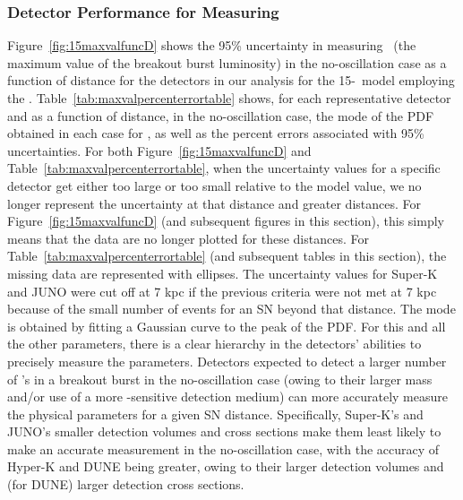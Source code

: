 \subsubsection{Detector Performance for Measuring \lmax}
Figure~\ref{fig:15maxvalfuncD} shows the 95\% uncertainty in
measuring \lmax\ (the maximum value of the breakout burst luminosity)
in the no-oscillation case as a function of distance for the detectors in our
analysis for the 15-\Msol\ model employing the \ls. 
Table~\ref{tab:maxvalpercenterrortable} shows, for each representative
detector and as a function of distance, in the no-oscillation case, 
the mode of the PDF obtained
in each case for \lmax, as well as the percent
errors associated with 95\% uncertainties.  For both
Figure~\ref{fig:15maxvalfuncD} and
Table~\ref{tab:maxvalpercenterrortable},  when the uncertainty values for a
  specific detector get either
  too large or too small relative to the model value, we no longer
  represent 
  the uncertainty at that distance and greater distances.  For
  Figure~\ref{fig:15maxvalfuncD} (and subsequent figures in this
  section), 
this simply means that the data are no
  longer plotted for these distances.  For
  Table~\ref{tab:maxvalpercenterrortable} (and subsequent tables in
  this section), the missing data are
  represented with ellipses.
The uncertainty values for 
Super-K and JUNO were cut off
  at 7 kpc if the previous criteria were not met at 7 kpc because of
  the small number of events for an SN beyond that
  distance.
The mode is obtained
by fitting a Gaussian curve to the peak of the PDF.
 For this and all the other parameters, there is a clear
hierarchy in the detectors' abilities to precisely measure the
parameters.  Detectors expected to detect a larger number of \nue's in
a breakout burst in the no-oscillation case 
(owing to their larger mass and/or use of a more
\nue-sensitive detection medium) can more accurately measure
the physical parameters for a given SN distance.  
Specifically, Super-K's
and JUNO's smaller detection volumes and cross sections make them least
likely to make an accurate measurement in the no-oscillation case, with the accuracy of  
Hyper-K and DUNE being greater, owing to their larger detection
volumes and (for DUNE) larger detection cross sections. 


